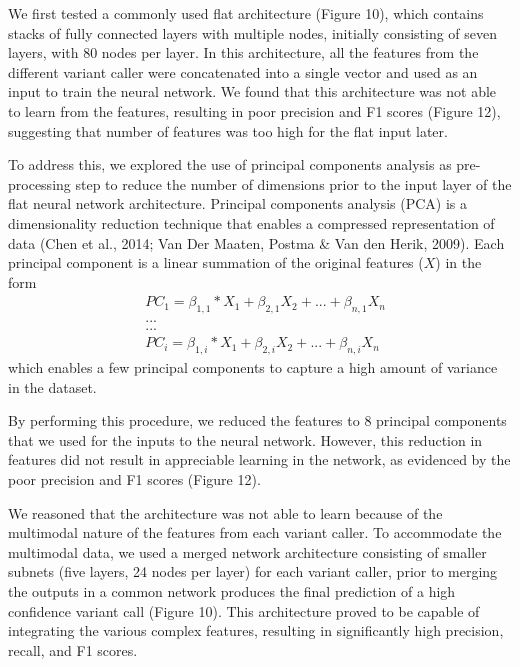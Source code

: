 \documentclass{article}
\begin{document}
We first tested a commonly used flat architecture (Figure 10), which contains stacks of fully connected layers with multiple nodes, initially consisting of seven layers, with 80 nodes per layer. In this architecture, all the features from the different variant caller were concatenated into a single vector and  used as an input to train the neural network. We found that this architecture was not able to learn from the features, resulting in poor precision and F1 scores (Figure 12), suggesting that number of features was too high for the flat input later. 

To address this, we explored the use of principal components analysis as pre-processing step to reduce the number of dimensions prior to the input layer of the flat neural network architecture. Principal components analysis (PCA) is a dimensionality reduction technique that enables a compressed representation of data (Chen et al., 2014; Van Der Maaten, Postma \& Van den Herik, 2009). Each principal component is a linear summation of the original features ($X$) in the form 
\begin{align*}
&PC_1 = \beta_{1,1}*X_{1} + \beta_{2,1} X_{2} +... + \beta_{n,1} X_n \\
&... \\
&... \\
&PC_i = \beta_{1,i}*X_{1} + \beta_{2,i} X_{2} +... + \beta_{n,i} X_n
\end{align*}
which enables a few principal components to capture a high amount of variance in the dataset.

By performing this procedure, we reduced the features to 8 principal components that we used for the inputs to the neural network. However, this reduction in features did not result in appreciable learning in the network, as evidenced by the poor precision and F1 scores (Figure 12).

We reasoned that the architecture was not able to learn because of the multimodal nature of the features from each variant caller. To accommodate the multimodal data, we used a merged network architecture consisting of smaller subnets (five layers, 24 nodes per layer) for each variant caller, prior to merging the outputs in a common network produces the final prediction of a high confidence variant call (Figure 10). This architecture proved to be capable of integrating the various complex features, resulting in significantly high precision, recall, and F1 scores. 
\end{document}
